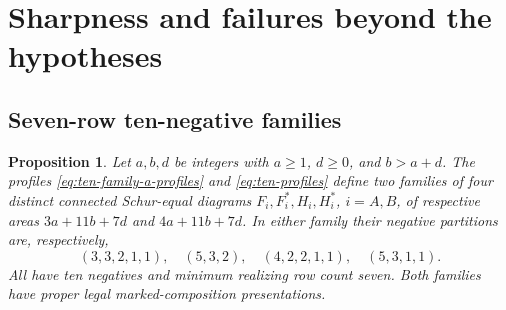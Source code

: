 \documentclass[11pt,a4paper]{amsart}
\numberwithin{equation}{section}
\theoremstyle{plain}
\newtheorem{proposition}[theorem]{Proposition}
\theoremstyle{definition}
\begin{document}
\section{Sharpness and failures beyond the hypotheses}\label{sec:threshold-boundaries}

\subsection{Seven-row ten-negative families}

\begin{proposition}\label{prop:ten-negative-quartet}
Let \(a,b,d\) be integers with \(a\ge1\), \(d\ge0\), and \(b>a+d\).
The profiles \eqref{eq:ten-family-a-profiles} and \eqref{eq:ten-profiles}
define two families of four distinct connected Schur-equal diagrams
\(F_i,F_i^*,H_i,H_i^*\), \(i=A,B\), of respective areas
\(3a+11b+7d\) and \(4a+11b+7d\).  In either family their negative
partitions are, respectively,
\begin{equation}\label{eq:ten-patterns}
 (3,3,2,1,1),\quad(5,3,2),\quad(4,2,2,1,1),\quad(5,3,1,1).
\end{equation}
All have ten negatives and minimum realizing row count seven.  Both
families have proper legal marked-composition presentations.
\end{proposition}
\end{document}
